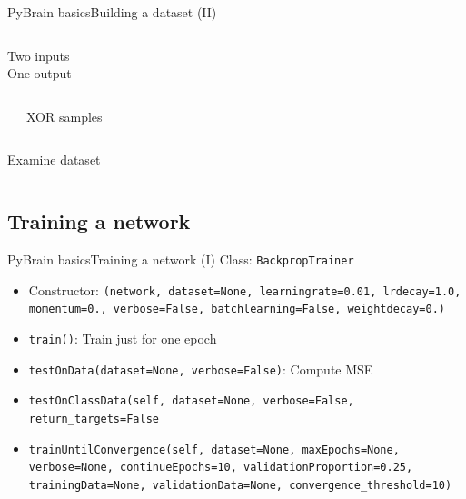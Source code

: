 \documentclass[10pt,compress]{beamer} %
\begin{document}
\begin{frame}{PyBrain basics}{Building a dataset (II)}
\small{
    \begin{columns}
	   Two inputs\\
	   One output
    	\begin{block}{}
       \vspace{-0.2cm}
       
       \vspace{-0.2cm}
    	\end{block}
	\end{columns}

    \begin{columns}
    	\begin{block}{}
       \vspace{-0.2cm}
       
       \vspace{-0.2cm}
    	\end{block}
	   XOR samples
	\end{columns}

    \begin{columns}
	   Examine dataset
    	\begin{block}{}
       \vspace{-0.2cm}
       
       \vspace{-0.2cm}
    	\end{block}
    	\begin{block}{}
       \vspace{-0.2cm}
       
       \vspace{-0.2cm}
    	\end{block}

	\end{columns}
}
\end{frame}

\subsection{Training a network}
\begin{frame}{PyBrain basics}{Training a network (I)}
	Class: \texttt{BackpropTrainer}
	\begin{itemize}
	\item Constructor: \texttt{(network, dataset=None, learningrate=0.01, lrdecay=1.0, momentum=0., verbose=False, batchlearning=False, weightdecay=0.)}
	\item \texttt{train()}: Train just for one epoch
	\item \texttt{testOnData(dataset=None, verbose=False)}: Compute MSE
	\item \texttt{testOnClassData(self, dataset=None, verbose=False, return\_targets=False}
	\item \texttt{trainUntilConvergence(self, dataset=None, maxEpochs=None, verbose=None, continueEpochs=10, validationProportion=0.25, trainingData=None, validationData=None, convergence\_threshold=10)}
	\end{itemize}
\end{frame}
\end{document}
